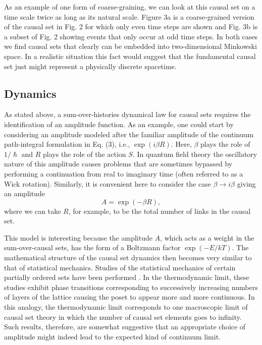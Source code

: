 \documentclass[aps,amssymb,12pt]{revtex4-2}
\begin{document}
As an example of one form of coarse-graining, we can look at this causal set
on a time scale twice as long as its natural scale. Figure 3a is a
coarse-grained version of the causal set in Fig. 2 for which only even time
steps are shown and Fig. 3b is a subset of Fig. 2 showing events that only
occur at odd time steps. In both cases we find causal sets that clearly can
be embedded into two-dimensional Minkowski space. In a realistic situation
this fact would suggest that the fundamental causal set just might represent
a physically discrete spacetime.

\subsection{Dynamics}

As stated above, a sum-over-histories dynamical law for causal sets requires
the identification of an amplitude function. As an example, one could start
by considering an amplitude modeled after the familiar amplitude of the
continuum path-integral formulation in Eq. (3), i.e., $\exp (i\beta R)$.
Here, $\beta $ plays the role of $1/\hslash $ and $R$ plays the role of the
action $S$. In quantum field theory the oscillatory nature of this amplitude
causes problems that are sometimes bypassed by performing a continuation
from real to imaginary time (often referred to as a Wick rotation).
Similarly, it is convenient here to consider the case $\beta \rightarrow
i\beta $ giving an amplitude
\begin{equation}
A=\exp (-\beta R),  \label{5}
\end{equation}
where we can take $R$, for example, to be the total number of links in the
causal set.

This model is interesting because the amplitude $A$, which acts as a weight
in the sum-over-causal sets, has the form of a Boltzmann factor $\exp
(-E/kT) $. The mathematical structure of the causal set dynamics then
becomes very similar to that of statistical mechanics. Studies of the
statistical mechanics of certain partially ordered sets have been performed
\cite{30}. In the thermodynamic limit, these studies exhibit phase transitions
corresponding to successively increasing numbers of layers of the lattice
causing the poset to appear more and more continuous. In this analogy, the
thermodynamic limit corresponds to one macroscopic limit of causal set
theory in which the number of causal set elements goes to infinity. Such
results, therefore, are somewhat suggestive that an appropriate choice of
amplitude might indeed lead to the expected kind of continuum limit.
\end{document}
